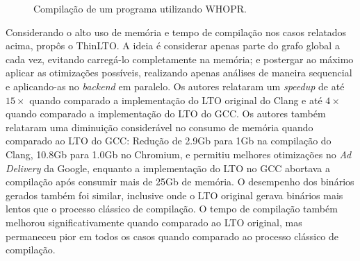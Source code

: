 \begin{figure}
\begin{center}
{
}
\end{center}
\caption{Compilação de um programa utilizando WHOPR.}
\label{fig:whopr_build}
\end{figure}


Considerando o alto uso de memória e tempo de compilação nos casos relatados
acima, \cite{Johnson:2017:TSI:3049832.3049845} propôs o ThinLTO. A ideia é
considerar apenas parte do grafo global a cada vez, evitando carregá-lo
completamente na memória; e postergar ao máximo aplicar as otimizações possíveis,
realizando apenas análises de maneira sequencial e aplicando-as no 
\textit{backend} em paralelo.
Os autores relataram um \textit{speedup} de até $15\times$ quando comparado a
implementação do LTO original do Clang e até $4\times$ quando comparado a
implementação do LTO do GCC. Os autores também relataram uma diminuição considerável
no consumo de memória quando comparado ao LTO do GCC: Redução de 2.9Gb para 1Gb
na compilação do Clang, 10.8Gb para 1.0Gb no Chromium, e permitiu melhores otimizações no
\textit{Ad Delivery} da Google, enquanto a implementação do LTO no GCC
abortava a compilação após consumir mais de 25Gb de memória. O desempenho dos
binários gerados também foi similar, inclusive onde o LTO original gerava
binários mais lentos que o processo clássico de compilação. O tempo de compilação
também melhorou significativamente quando comparado ao LTO original,
mas permaneceu pior em todos os casos quando comparado ao processo clássico de
compilação.

